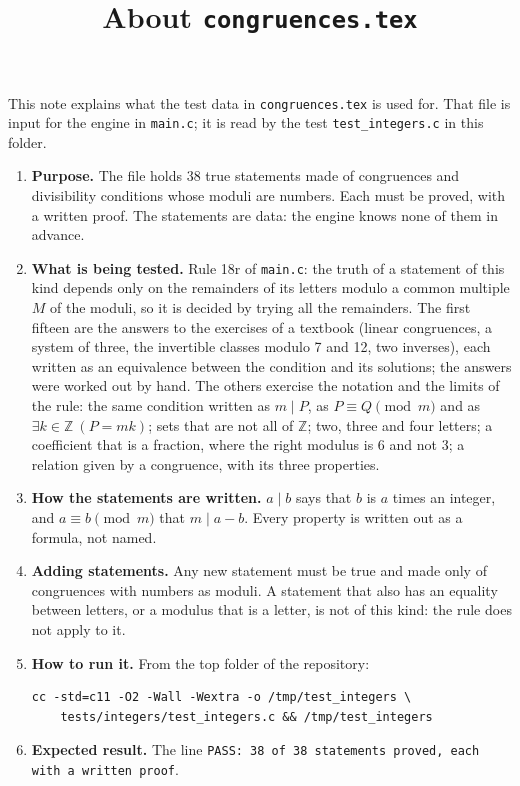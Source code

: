 \documentclass[11pt,a4paper]{article}
\title{About \texttt{congruences.tex}}
\author{}
\date{}
\begin{document}
\maketitle
This note explains what the test data in \texttt{congruences.tex} is used for. That file is input for the engine in \texttt{main.c}; it is read by the test \texttt{test\_integers.c} in this folder.

\begin{enumerate}
\item \textbf{Purpose.} The file holds 38 true statements made of congruences and divisibility conditions whose moduli are numbers. Each must be proved, with a written proof. The statements are data: the engine knows none of them in advance.

\item \textbf{What is being tested.} Rule 18r of \texttt{main.c}: the truth of a statement of this kind depends only on the remainders of its letters modulo a common multiple $M$ of the moduli, so it is decided by trying all the remainders. The first fifteen are the answers to the exercises of a textbook (linear congruences, a system of three, the invertible classes modulo 7 and 12, two inverses), each written as an equivalence between the condition and its solutions; the answers were worked out by hand. The others exercise the notation and the limits of the rule: the same condition written as $m \mid P$, as $P \equiv Q \pmod{m}$ and as $\exists k \in \mathbb{Z}\ (P = mk)$; sets that are not all of $\mathbb{Z}$; two, three and four letters; a coefficient that is a fraction, where the right modulus is 6 and not 3; a relation given by a congruence, with its three properties.

\item \textbf{How the statements are written.} $a \mid b$ says that $b$ is $a$ times an integer, and $a \equiv b \pmod{m}$ that $m \mid a - b$. Every property is written out as a formula, not named.

\item \textbf{Adding statements.} Any new statement must be true and made only of congruences with numbers as moduli. A statement that also has an equality between letters, or a modulus that is a letter, is not of this kind: the rule does not apply to it.

\item \textbf{How to run it.} From the top folder of the repository:
\begin{verbatim}
cc -std=c11 -O2 -Wall -Wextra -o /tmp/test_integers \
    tests/integers/test_integers.c && /tmp/test_integers
\end{verbatim}

\item \textbf{Expected result.} The line \texttt{PASS: 38 of 38 statements proved, each with a written proof}.
\end{enumerate}
\end{document}
